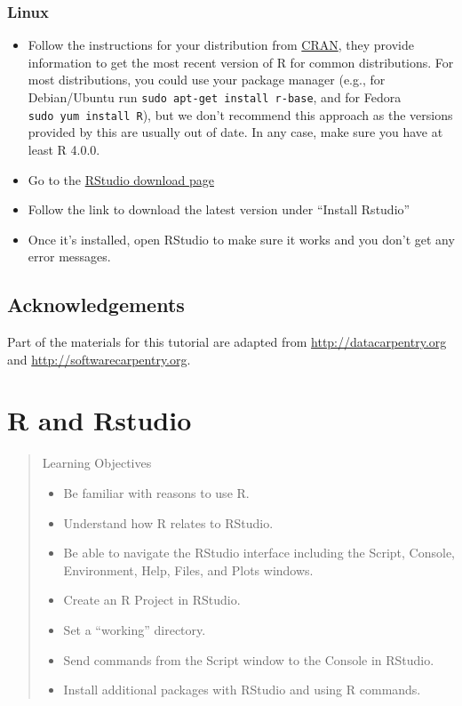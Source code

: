 \documentclass[
]{book}
\providecommand{\tightlist}{%
  \setlength{\itemsep}{0pt}\setlength{\parskip}{0pt}}
\begin{document}
\hypertarget{linux}{%
\subsection*{Linux}\label{linux}}

\begin{itemize}
\tightlist
\item
  Follow the instructions for your distribution
  from \href{https://cloud.r-project.org/bin/linux}{CRAN}, they provide information
  to get the most recent version of R for common distributions. For most
  distributions, you could use your package manager (e.g., for Debian/Ubuntu run
  \texttt{sudo\ apt-get\ install\ r-base}, and for Fedora \texttt{sudo\ yum\ install\ R}), but we
  don't recommend this approach as the versions provided by this are
  usually out of date. In any case, make sure you have at least R 4.0.0.
\item
  Go to the \href{https://posit.co/download/rstudio-desktop/}{RStudio download page}
\item
  Follow the link to download the latest version under ``Install Rstudio''
\item
  Once it's installed, open RStudio to make sure it works and you don't get any
  error messages.
\end{itemize}

\hypertarget{acknowledgements}{%
\section*{Acknowledgements}\label{acknowledgements}}

Part of the materials for this tutorial are adapted from \url{http://datacarpentry.org} and \url{http://softwarecarpentry.org}.

\hypertarget{backgroud}{%
\chapter{R and Rstudio}\label{backgroud}}

\begin{quote}
Learning Objectives

\begin{itemize}
\tightlist
\item
  Be familiar with reasons to use R.
\item
  Understand how R relates to RStudio.
\item
  Be able to navigate the RStudio interface including the Script, Console, Environment, Help, Files, and Plots windows.
\item
  Create an R Project in RStudio.
\item
  Set a ``working'' directory.
\item
  Send commands from the Script window to the Console in RStudio.
\item
  Install additional packages with RStudio and using R commands.
\end{itemize}
\end{quote}
\end{document}
